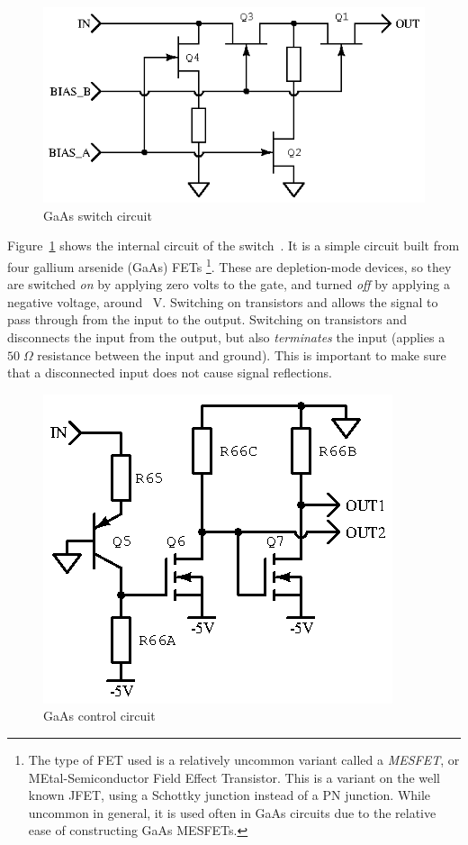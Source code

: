 \begin{figure}[H]
\centering
\includegraphics{too/gaassw}
\caption{GaAs switch circuit}
\label{fig:gaassw}
\end{figure}

Figure~\ref{fig:gaassw} shows the internal circuit of the
switch~\cite{maswss0162}.  It is a simple circuit built from four gallium
arsenide (GaAs) FETs \footnote{The type of FET used is a relatively uncommon
    variant called a \emph{MESFET}, or MEtal-Semiconductor Field Effect
Transistor. This is a variant on the well known JFET, using a Schottky junction
instead of a PN junction. While uncommon in general, it is used often in GaAs
circuits due to the relative ease of constructing GaAs MESFETs.}.  These are
depletion-mode devices, so they are switched \emph{on} by applying zero volts
to the gate, and turned \emph{off} by applying a negative voltage, around
~V.  Switching on transistors  and  allows the
signal to pass through from the input to the output. Switching on transistors
 and  disconnects the input from the output, but also
\emph{terminates} the input (applies a $50\;\Omega$ resistance between the
input and ground). This is important to make sure that a disconnected input
does not cause signal reflections.

\begin{figure}[H]
\centering
\includegraphics{too/gaasctl}
\caption{GaAs control circuit}
\label{fig:gaasctl}
\end{figure}

